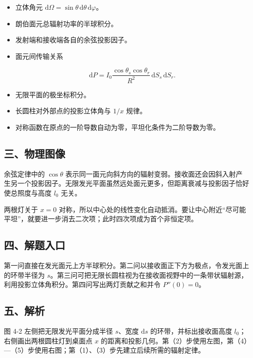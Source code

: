 \documentclass[12pt,a4paper,UTF8]{ctexart}
\begin{document}
\begin{itemize}
\item
  立体角元
  \(\mathrm{d}\Omega=\sin\theta\,\mathrm{d}\theta\,\mathrm{d}\varphi\)。
\item
  朗伯面元总辐射功率的半球积分。
\item
  发射端和接收端各自的余弦投影因子。
\item
  面元间传输关系

  \[\mathrm{d}P=I_0\frac{\cos\theta_s\cos\theta_r}{R^2}\,\mathrm{d}S_s\,\mathrm{d}S_r.\]
\item
  无限平面的极坐标积分。
\item
  长圆柱对外部点的投影立体角与 \(1/x\) 规律。
\item
  对称函数在原点的一阶导数自动为零，平坦化条件为二阶导数为零。
\end{itemize}

\subsection{三、物理图像}\label{ux4e09ux7269ux7406ux56feux50cf-3}

余弦定律中的 \(\cos\theta\)
表示同一面元向斜方向的辐射变弱。接收面还会因斜入射产生另一个投影因子。无限发光平面虽然远处面元更多，但距离衰减与投影因子恰好使总照度与高度
\(l_0\) 无关。

两根灯关于 \(x=0\)
对称，所以中心处的线性变化自动抵消。要让中心附近``尽可能平坦''，就要进一步消去二次项；此时四次项成为首个非恒定项。

\subsection{四、解题入口}\label{ux56dbux89e3ux9898ux5165ux53e3-3}

第一问直接在发光面元上方半球积分。第二问以接收面正下方为极点，令发光面上的环带半径为
\(s\)。第三问可把无限长圆柱视为在接收面视野中的一条带状辐射源，利用投影立体角积分。第四问写出两灯贡献之和并令
\(P''(0)=0\)。

\subsection{五、解析}\label{ux4e94ux89e3ux6790-3}

图 4-2 左侧把无限发光平面分成半径 \(s\)、宽度 \(\mathrm{d}s\)
的环带，并标出接收面高度 \(l_0\)；右侧画出两根圆柱灯到桌面点 \(x\)
的距离和投影几何。第（2）步使用左图，第（4）---（5）步使用右图；第（1）、（3）步先建立后续所需的辐射定律。
\end{document}
